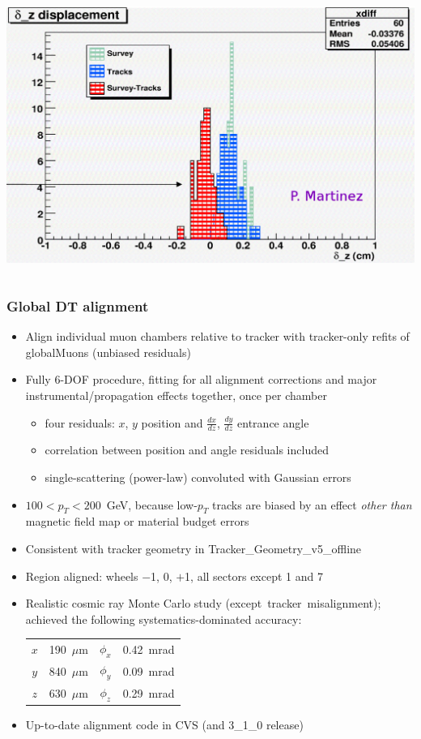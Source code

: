 \documentclass[compress]{beamer}
\begin{document}
\begin{frame}
\begin{columns}
\vspace{0.5 cm}
\includegraphics[width=\linewidth]{internal_alignment.png}
\end{columns}
\end{frame}

\begin{frame}
\frametitle{Global DT alignment}
\begin{itemize}
\item Align individual muon chambers relative to tracker with tracker-only refits of globalMuons (unbiased residuals)
\item Fully 6-DOF procedure, fitting for all alignment corrections and major instrumental/propagation effects together, once per chamber
\begin{itemize}
\item four residuals: $x$, $y$ position and $\frac{dx}{dz}$, $\frac{dy}{dz}$ entrance angle
\item correlation between position and angle residuals included
\item single-scattering (power-law) convoluted with Gaussian errors
\end{itemize}
\item $100 < p_T < 200$~GeV, because low-$p_T$ tracks are biased by an effect {\it other than} magnetic field map or material budget errors
\item Consistent with tracker geometry in Tracker\_Geometry\_v5\_offline
\item Region aligned: wheels $-$1, 0, $+$1, all sectors except 1 and 7
\item Realistic cosmic ray Monte Carlo study \mbox{(except tracker misalignment);\hspace{-1 cm}} \\ achieved the following systematics-dominated accuracy:
\begin{center}
\begin{tabular}{c c c c}
$x$ & 190~$\mu$m & $\phi_x$ & 0.42~mrad \\
$y$ & 840~$\mu$m & $\phi_y$ & 0.09~mrad \\
$z$ & 630~$\mu$m & $\phi_z$ & 0.29~mrad
\end{tabular}
\end{center}
\item Up-to-date alignment code in CVS (and 3\_1\_0 release)
\end{itemize}
\end{frame}
\end{document}
